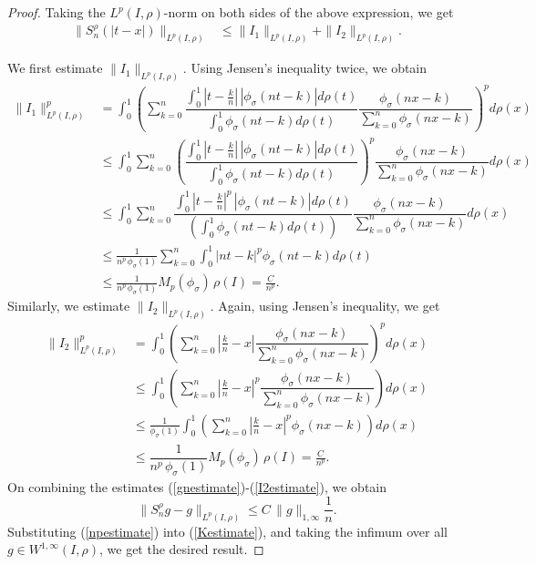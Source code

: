 \documentclass[12pt, reqno]{amsart}
\numberwithin{equation}{section}
\theoremstyle{definition}
\theoremstyle{remark}
\numberwithin{equation}{section}
\newcommand{\Lp}{L^p(I, \rho)}
\begin{document}
\begin{proof}
Taking the $\Lp$-norm on both sides of the above expression, we get
\begin{align}
    \|S^{\rho}_n(|t-x|)\|_{\Lp} &\leq \|I_1\|_{\Lp} + \|I_2\|_{\Lp}. \label{modestimate}
\end{align}

We first estimate $\|I_1\| _{\Lp}$. Using Jensen's inequality twice, we obtain 
 \begin{align}
\|I_1\|^p_{\Lp} &= \displaystyle{\int_0^1\left(\sum_{k=0}^n\dfrac{\int_0^1|t-\frac{k}{n}|\,|\phi_\sigma(nt-k)|d\rho(t)}{\int_0^1\phi_\sigma(nt-k)d\rho(t)}\dfrac{\phi_\sigma(nx-k)}{\sum_{k=0}^n\phi_\sigma(nx-k)}\right)^p}d\rho(x) \nonumber\\
&\leq \displaystyle{\int_0^1\sum_{k=0}^n\left(\dfrac{\int_0^1|t-\frac{k}{n}|\,|\phi_\sigma(nt-k)|d\rho(t)}{\int_0^1\phi_\sigma(nt-k)d\rho(t)}\right)^p\dfrac{\phi_\sigma(nx-k)}{\sum_{k=0}^n\phi_\sigma(nx-k)}}d\rho(x) \nonumber \\
&\leq \displaystyle{\int_0^1\sum_{k=0}^n\dfrac{\int_0^1|t-\frac{k}{n}|^p\,|\phi_\sigma(nt-k)|d\rho(t)}{\left(\int_0^1\phi_\sigma(nt-k)d\rho(t)\right)}\dfrac{\phi_\sigma(nx-k)}{\sum_{k=0}^n\phi_\sigma(nx-k)}}d\rho(x) \quad \nonumber \\
&\leq \frac{1}{n^p\,\phi_\sigma(1)} \displaystyle{\sum_{k=0}^n}\int_0^1 |nt-k|^p\phi_\sigma(nt-k)d\rho(t) \nonumber\\
&\leq \frac{1}{n^p\,\phi_\sigma(1)} M_p(\phi_\sigma) \, \rho(I) 
=  \frac{C}{n^p}. \label{I1estimate}
\end{align}
Similarly, we estimate $\|I_2\|_{\Lp}.$ Again, using Jensen's inequality, we get 
\begin{align}
\|I_2\|^p_{\Lp} &= \displaystyle{\int_0^1 \left( \sum_{k=0}^n\left|\frac{k}{n}-x\right| \dfrac{\phi_\sigma(nx-k)}{\sum_{k=0} ^n\phi_\sigma(nx-k)} \right)^p} d\rho(x) \nonumber \\
&\leq \displaystyle{\int_0^1 \left( \sum_{k=0}^n\left|\frac{k}{n}-x\right|^p \dfrac{\phi_\sigma(nx-k)}{\sum_{k=0} ^n\phi_\sigma(nx-k)} \right)} d\rho(x) \nonumber \\
&\leq \frac{1}{\phi_\sigma(1)} \int_{0}^1 \left(\sum_{k=0}^n\left|\frac{k}{n}-x\right|^p \phi_\sigma(nx-k)\right)  d\rho(x) \nonumber \\
&\leq \dfrac{1}{n^p\,\phi_\sigma(1)} M_p(\phi_\sigma)\, \rho(I)
 = \frac{C}{n^p}. \label{I2estimate}
\end{align}
On combining the estimates (\ref{gnestimate})-(\ref{I2estimate}), we obtain
\begin{equation}
    \|S^{\rho}_ng-g\|_{\Lp}  \leq C \, \|g\|_{1,\infty} \frac{1}{n}. \label{npestimate}
\end{equation}
Substituting (\ref{npestimate}) into (\ref{Kestimate}), and taking the infimum over all $g\in W^{1,\infty}(I,\rho)$, we get the desired result.
\end{proof}
\end{document}
